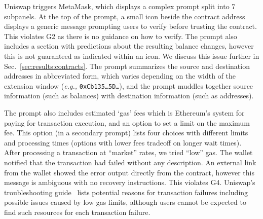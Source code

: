 \documentclass[conference]{IEEEtran}
\begin{document}

Uniswap triggers MetaMask, which displays a complex prompt split into 7 subpanels. %
At the top of the prompt, a small icon beside the contract address displays a generic message prompting users to verify before trusting the contract.
This violates G2 as there is no guidance on how to verify.
The prompt also includes a section with predictions about the resulting balance changes, however this is not guaranteed as indicated within an icon.
We discuss this issue further in Sec.~\ref{sec:results:contracts}.
The prompt summarizes the source and destination addresses in abbreviated form, which varies depending on the width of the extension window (\textit{e.g.,} \texttt{0xCb135\ldots 5D\ldots}), and the prompt muddles together source information (such as balances) with destination information (such as addresses). 

The prompt also includes estimated `gas' fees which is Ethereum's system for paying for transaction execution, and an option to set a limit on the maximum fee.
This option (in a secondary prompt) lists four choices with different limits and processing times (options with lower fees tradeoff on longer wait times).
After processing a transaction at ``market'' rates, we tried ``low'' gas. 
The wallet notified that the transaction had failed without any description.
An external link from the wallet showed the error output directly from the contract, however this message is ambiguous with no recovery instructions.
This violates G4.
Uniswap's troubleshooting guide~\cite{uniswapTransactionFail} lists potential reasons for transaction failures including possible issues caused by low gas limits, although users cannot be expected to find such resources for each transaction failure.

\end{document}
